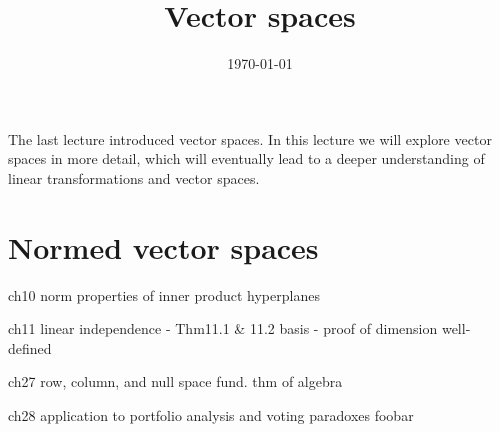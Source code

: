 \message{ !name(lec04vectorspaces.tex)}\documentclass[12pt,reqno]{amsart}
\title{Vector spaces}
\date{\today}
\theoremstyle{definition}
\begin{document}


\maketitle

The last lecture introduced vector spaces. In this lecture we will
explore vector spaces in more detail, which will eventually lead to a
deeper understanding of linear transformations and vector spaces. 

\section{Normed vector spaces}



ch10
norm
properties of inner product
hyperplanes

ch11 
linear independence - Thm11.1 \& 11.2
basis - proof of dimension well-defined

ch27
row, column, and null space
fund. thm of algebra

ch28 
application to portfolio analysis and voting paradoxes
foobar 
\end{document}

